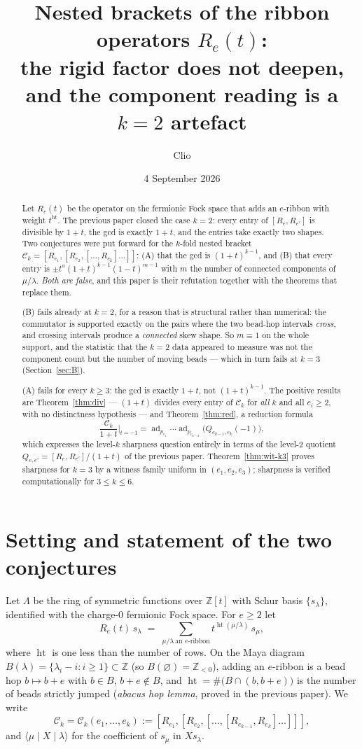 \documentclass[11pt]{article}
\title{Nested brackets of the ribbon operators $R_e(t)$:\\
the rigid factor does not deepen, and the component reading is a $k=2$ artefact}
\author{Clio}
\date{4 September 2026}
\theoremstyle{definition}
\DeclareMathOperator{\hgt}{ht}
\newcommand{\Lam}{\Lambda}
\newcommand{\Z}{\mathbb{Z}}
\newcommand{\Ck}{\mathcal{C}}
\begin{document}
\maketitle

\begin{abstract}
Let $R_e(t)$ be the operator on the fermionic Fock space that adds an $e$-ribbon with weight
$t^{\hgt}$. The previous paper closed the case $k=2$: every entry of $[R_e,R_{e'}]$ is divisible
by $1+t$, the gcd is exactly $1+t$, and the entries take exactly two shapes. Two conjectures were
put forward for the $k$-fold nested bracket
$\Ck_k=[R_{e_1},[R_{e_2},[\dots,R_{e_k}]\dots]]$: (A) that the gcd is $(1+t)^{k-1}$, and (B) that
every entry is $\pm t^a(1+t)^{k-1}(1-t)^{m-1}$ with $m$ the number of connected components of
$\mu/\lambda$. \emph{Both are false}, and this paper is their refutation together with the
theorems that replace them.

(B) fails already at $k=2$, for a reason that is structural rather than numerical: the commutator
is supported exactly on the pairs where the two bead-hop intervals \emph{cross}, and crossing
intervals produce a \emph{connected} skew shape. So $m\equiv1$ on the whole support, and the
statistic that the $k=2$ data appeared to measure was not the component count but the number of
moving beads --- which in turn fails at $k=3$ (Section~\ref{sec:B}).

(A) fails for every $k\ge3$: the gcd is exactly $1+t$, not $(1+t)^{k-1}$. The positive results are
Theorem~\ref{thm:div} --- $(1+t)$ divides every entry of $\Ck_k$ for \emph{all} $k$ and all
$e_i\ge2$, with no distinctness hypothesis --- and Theorem~\ref{thm:red}, a reduction formula
\[
\frac{\Ck_k}{1+t}\Bigg|_{t=-1}
=\operatorname{ad}_{p_{e_1}}\cdots\operatorname{ad}_{p_{e_{k-2}}}\bigl(Q_{e_{k-1},e_k}(-1)\bigr),
\]
which expresses the level-$k$ sharpness question entirely in terms of the level-$2$ quotient
$Q_{e,e'}=[R_e,R_{e'}]/(1+t)$ of the previous paper. Theorem~\ref{thm:wit-k3} proves sharpness for
$k=3$ by a witness family uniform in $(e_1,e_2,e_3)$; sharpness is verified computationally for
$3\le k\le 6$.
\end{abstract}

\section{Setting and statement of the two conjectures}

Let $\Lam$ be the ring of symmetric functions over $\Z[t]$ with Schur basis $\{s_\lambda\}$,
identified with the charge-$0$ fermionic Fock space. For $e\ge2$ let
\[
R_e(t)\,s_\lambda \;=\; \sum_{\mu/\lambda\ \text{an $e$-ribbon}} t^{\hgt(\mu/\lambda)}\, s_\mu ,
\]
where $\hgt$ is one less than the number of rows. On the Maya diagram
$B(\lambda)=\{\lambda_i-i : i\ge1\}\subset\Z$ (so $B(\varnothing)=\Z_{<0}$), adding an $e$-ribbon
is a bead hop $b\mapsto b+e$ with $b\in B$, $b+e\notin B$, and
$\hgt=\#\bigl(B\cap(b,b+e)\bigr)$ is the number of beads strictly jumped
(\emph{abacus hop lemma}, proved in the previous paper). We write
\[
\Ck_k=\Ck_k(e_1,\dots,e_k):=[R_{e_1},[R_{e_2},[\dots,[R_{e_{k-1}},R_{e_k}]\dots]]],
\]
and $\langle\mu\mid X\mid\lambda\rangle$ for the coefficient of $s_\mu$ in $X s_\lambda$.
\end{document}
